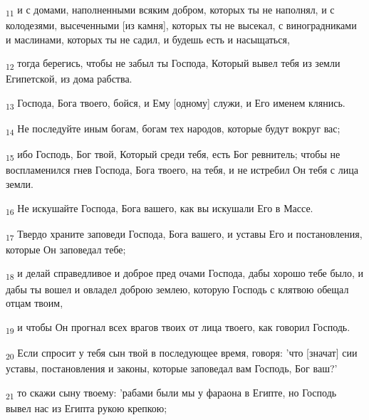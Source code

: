 \begin{tcolorbox}
\textsubscript{11} и с домами, наполненными всяким добром, которых ты не наполнял, и с колодезями, высеченными [из камня], которых ты не высекал, с виноградниками и маслинами, которых ты не садил, и будешь есть и насыщаться,
\end{tcolorbox}
\begin{tcolorbox}
\textsubscript{12} тогда берегись, чтобы не забыл ты Господа, Который вывел тебя из земли Египетской, из дома рабства.
\end{tcolorbox}
\begin{tcolorbox}
\textsubscript{13} Господа, Бога твоего, бойся, и Ему [одному] служи, и Его именем клянись.
\end{tcolorbox}
\begin{tcolorbox}
\textsubscript{14} Не последуйте иным богам, богам тех народов, которые будут вокруг вас;
\end{tcolorbox}
\begin{tcolorbox}
\textsubscript{15} ибо Господь, Бог твой, Который среди тебя, есть Бог ревнитель; чтобы не воспламенился гнев Господа, Бога твоего, на тебя, и не истребил Он тебя с лица земли.
\end{tcolorbox}
\begin{tcolorbox}
\textsubscript{16} Не искушайте Господа, Бога вашего, как вы искушали Его в Массе.
\end{tcolorbox}
\begin{tcolorbox}
\textsubscript{17} Твердо храните заповеди Господа, Бога вашего, и уставы Его и постановления, которые Он заповедал тебе;
\end{tcolorbox}
\begin{tcolorbox}
\textsubscript{18} и делай справедливое и доброе пред очами Господа, дабы хорошо тебе было, и дабы ты вошел и овладел доброю землею, которую Господь с клятвою обещал отцам твоим,
\end{tcolorbox}
\begin{tcolorbox}
\textsubscript{19} и чтобы Он прогнал всех врагов твоих от лица твоего, как говорил Господь.
\end{tcolorbox}
\begin{tcolorbox}
\textsubscript{20} Если спросит у тебя сын твой в последующее время, говоря: 'что [значат] сии уставы, постановления и законы, которые заповедал вам Господь, Бог ваш?'
\end{tcolorbox}
\begin{tcolorbox}
\textsubscript{21} то скажи сыну твоему: 'рабами были мы у фараона в Египте, но Господь вывел нас из Египта рукою крепкою;
\end{tcolorbox}
